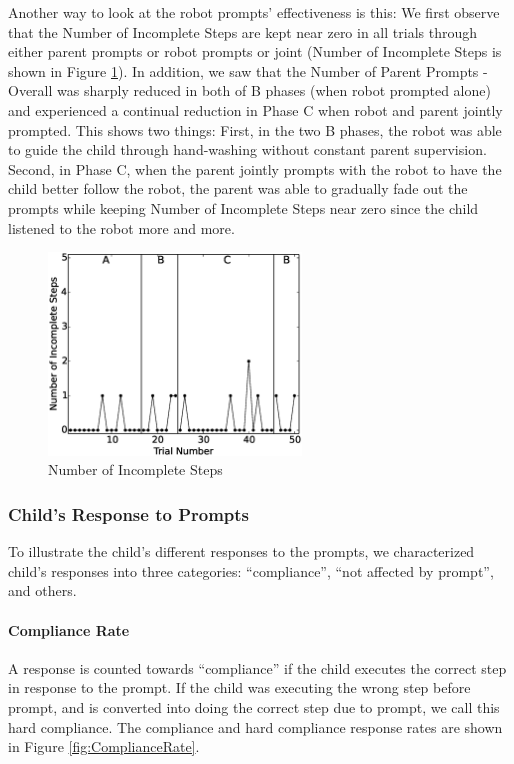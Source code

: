 Another way to look at the robot prompts' effectiveness is this: We first observe that the Number of Incomplete Steps are kept near zero in all trials through either parent prompts or robot prompts or joint (Number of Incomplete Steps is shown in Figure \ref{fig:4NumberofIncompleteSteps}).  In addition, we saw that the Number of Parent Prompts - Overall was sharply reduced in both of B phases (when robot prompted alone) and experienced a continual reduction in Phase C when robot and parent jointly prompted.  This shows two things: First, in the two B phases, the robot was able to guide the child through hand-washing without constant parent supervision.  Second, in Phase C, when the parent jointly prompts with the robot to have the child better follow the robot, the parent was able to gradually fade out the prompts while keeping Number of Incomplete Steps near zero since the child listened to the robot more and more.

\begin{figure} [h]
	\centering
	\includegraphics[width=0.6\textwidth]{./img/data_analysis/4NumberofIncompleteSteps.eps}
	\caption{Number of Incomplete Steps}
	\label{fig:4NumberofIncompleteSteps}
\end{figure}





\subsubsection{Child's Response to Prompts}
To illustrate the child's different responses to the prompts, we characterized child's responses into three categories: ``compliance'', ``not affected by prompt'', and others.

\paragraph{Compliance Rate}
A response is counted towards ``compliance'' if the child executes the correct step in response to the prompt.  If the child was executing the wrong step before prompt, and is converted into doing the correct step due to prompt, we call this hard compliance.  The compliance and hard compliance response rates are shown in Figure \ref{fig:ComplianceRate}.

